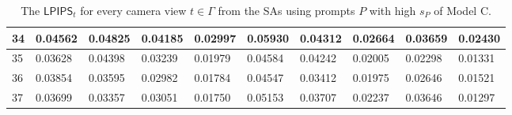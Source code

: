 \begin{table}[H]
{\begin{tabular}{|l|l|l|l|l|l|l|l|l|l|}
        34 & 0.04562 & 0.04825 & 0.04185 & 0.02997 & 0.05930 & 0.04312 & 0.02664 & 0.03659 & 0.02430 \\ \hline
        35 & 0.03628 & 0.04398 & 0.03239 & 0.01979 & 0.04584 & 0.04242 & 0.02005 & 0.02298 & 0.01331 \\ \hline
        36 & 0.03854 & 0.03595 & 0.02982 & 0.01784 & 0.04547 & 0.03412 & 0.01975 & 0.02646 & 0.01521 \\ \hline
        37 & 0.03699 & 0.03357 & 0.03051 & 0.01750 & 0.05153 & 0.03707 & 0.02237 & 0.03646 & 0.01297 \\ \hline
    \end{tabular}}
	\caption{The $ \mathsf{LPIPS}_t$ for every camera view $t \in \varGamma$ from the SAs using prompts $P$ with high $s_P$ of Model C.}

\end{table}


